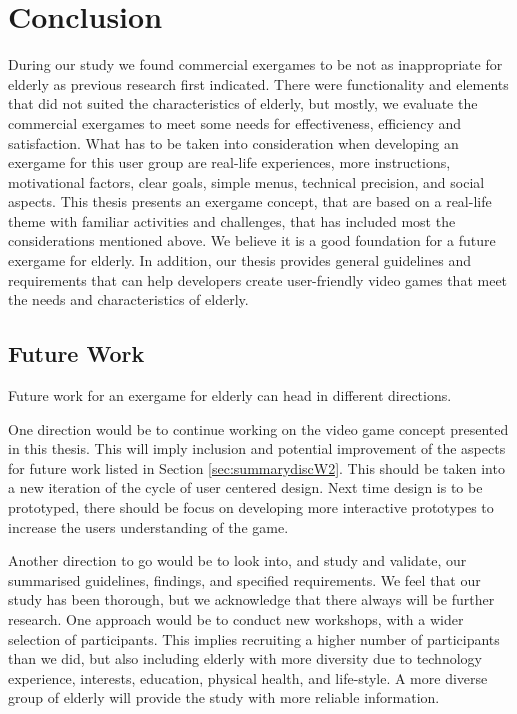 \chapter{Conclusion}

During our study we found commercial exergames to be not as inappropriate for elderly as previous research first indicated. There were functionality and elements that did not suited the characteristics of elderly, but mostly, we evaluate the commercial exergames to meet some needs for effectiveness, efficiency and satisfaction.  What has to be taken into consideration when developing an exergame for this user group are real-life experiences, more instructions, motivational factors, clear goals, simple menus, technical precision, and social aspects. This thesis presents an exergame concept, that are based on a real-life theme with familiar activities and challenges, that has included most the considerations mentioned above. We believe it is a good foundation for a future exergame for elderly. In addition, our thesis provides general guidelines and requirements that can help developers create user-friendly video games that meet the needs and characteristics of elderly.  

\section{Future Work}

Future work for an exergame for elderly can head in different directions. 

One direction would be to continue working on the video game concept presented in this thesis. This will imply inclusion and potential improvement of the aspects for future work listed in Section \ref{sec:summarydiscW2}. This should be taken into a new iteration of the cycle of user centered design. Next time design is to be prototyped, there should be focus on developing more interactive prototypes to increase the users understanding of the game. 

Another direction to go would be to look into, and study and validate, our summarised guidelines, findings, and specified requirements. We feel that our study has been thorough, but we acknowledge that there always will be further research. One approach would be to conduct new workshops, with a wider selection of participants. This implies recruiting a higher number of participants than we did, but also including elderly with more diversity due to technology experience, interests, education, physical health, and life-style. A more diverse group of elderly will provide the study with more reliable information.   

